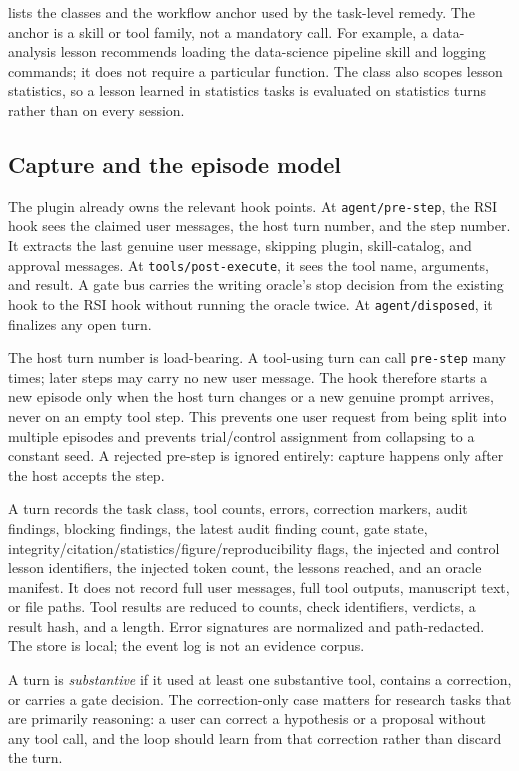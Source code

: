  lists the classes and the workflow anchor used by the task-level remedy. The anchor is a skill or tool family, not a mandatory call. For example, a data-analysis lesson recommends loading the data-science pipeline skill and logging commands; it does not require a particular function. The class also scopes lesson statistics, so a lesson learned in statistics tasks is evaluated on statistics turns rather than on every session.



\subsection{Capture and the episode model}
\label{sec:capture}
The plugin already owns the relevant hook points. At \texttt{agent/pre-step}, the RSI hook sees the claimed user messages, the host turn number, and the step number. It extracts the last genuine user message, skipping plugin, skill-catalog, and approval messages. At \texttt{tools/post-execute}, it sees the tool name, arguments, and result. A gate bus carries the writing oracle's stop decision from the existing \ah{} hook to the RSI hook without running the oracle twice. At \texttt{agent/disposed}, it finalizes any open turn.

The host turn number is load-bearing. A tool-using turn can call \texttt{pre-step} many times; later steps may carry no new user message. The hook therefore starts a new episode only when the host turn changes or a new genuine prompt arrives, never on an empty tool step. This prevents one user request from being split into multiple episodes and prevents trial/control assignment from collapsing to a constant seed. A rejected pre-step is ignored entirely: capture happens only after the host accepts the step.

A turn records the task class, tool counts, errors, correction markers, audit findings, blocking findings, the latest audit finding count, gate state, integrity/citation/statistics/figure/reproducibility flags, the injected and control lesson identifiers, the injected token count, the lessons reached, and an oracle manifest. It does not record full user messages, full tool outputs, manuscript text, or file paths. Tool results are reduced to counts, check identifiers, verdicts, a result hash, and a length. Error signatures are normalized and path-redacted. The store is local; the event log is not an evidence corpus.

A turn is \emph{substantive} if it used at least one substantive tool, contains a correction, or carries a gate decision. The correction-only case matters for research tasks that are primarily reasoning: a user can correct a hypothesis or a proposal without any tool call, and the loop should learn from that correction rather than discard the turn.

